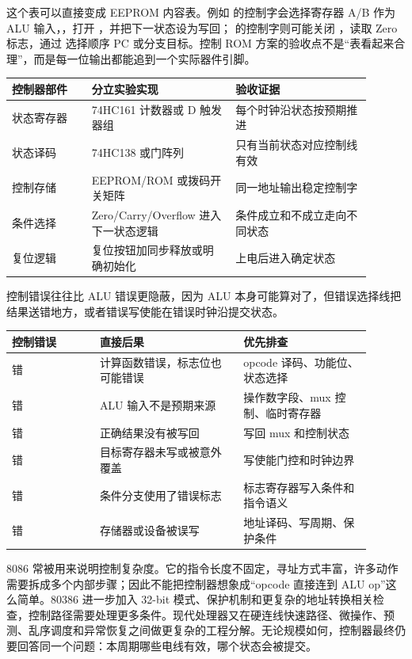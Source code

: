 这个表可以直接变成 EEPROM 内容表。例如  的控制字会选择寄存器 A/B 作为 ALU 输入，，打开 ，并把下一状态设为写回； 的控制字则可能关闭 ，读取 Zero 标志，通过  选择顺序 PC 或分支目标。控制 ROM 方案的验收点不是“表看起来合理”，而是每一位输出都能追到一个实际器件引脚。

\begin{longtable}{L{0.2\linewidth}L{0.36\linewidth}L{0.34\linewidth}}
\toprule
控制器部件 & 分立实验实现 & 验收证据 \\
\midrule
状态寄存器 & 74HC161 计数器或 D 触发器组 & 每个时钟沿状态按预期推进 \\
状态译码 & 74HC138 或门阵列 & 只有当前状态对应控制线有效 \\
控制存储 & EEPROM/ROM 或拨码开关矩阵 & 同一地址输出稳定控制字 \\
条件选择 & Zero/Carry/Overflow 进入下一状态逻辑 & 条件成立和不成立走向不同状态 \\
复位逻辑 & 复位按钮加同步释放或明确初始化 & 上电后进入确定状态 \\
\bottomrule
\end{longtable}

控制错误往往比 ALU 错误更隐蔽，因为 ALU 本身可能算对了，但错误选择线把结果送错地方，或者错误写使能在错误时钟沿提交状态。

\begin{longtable}{L{0.22\linewidth}L{0.36\linewidth}L{0.32\linewidth}}
\toprule
控制错误 & 直接后果 & 优先排查 \\
\midrule
{} 错 & 计算函数错误，标志位也可能错误 & opcode 译码、功能位、状态选择 \\
 错 & ALU 输入不是预期来源 & 操作数字段、mux 控制、临时寄存器 \\
 错 & 正确结果没有被写回 & 写回 mux 和控制状态 \\
 错 & 目标寄存器未写或被意外覆盖 & 写使能门控和时钟边界 \\
 错 & 条件分支使用了错误标志 & 标志寄存器写入条件和指令语义 \\
 错 & 存储器或设备被误写 & 地址译码、写周期、保护条件 \\
\bottomrule
\end{longtable}

8086 常被用来说明控制复杂度。它的指令长度不固定，寻址方式丰富，许多动作需要拆成多个内部步骤；因此不能把控制器想象成“opcode 直接连到 ALU op”这么简单。80386 进一步加入 32-bit 模式、保护机制和更复杂的地址转换相关检查，控制路径需要处理更多条件。现代处理器又在硬连线快速路径、微操作、预测、乱序调度和异常恢复之间做更复杂的工程分解。无论规模如何，控制器最终仍要回答同一个问题：本周期哪些电线有效，哪个状态会被提交。

